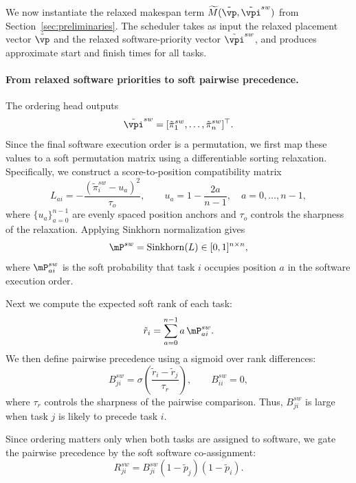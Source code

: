 We now instantiate the relaxed makespan term $\widetilde{M}(\tilde{\vp},\tilde{\vpi}^{sw})$ from Section~\ref{sec:preliminaries}. The scheduler takes as input the relaxed placement vector $\tilde{\vp}$ and the relaxed software-priority vector $\tilde{\vpi}^{sw}$, and produces approximate start and finish times for all tasks.

\paragraph{\textbf{From relaxed software priorities to soft pairwise precedence.}}
The ordering head outputs
\begin{equation}
\tilde{\vpi}^{sw}=[\tilde{\pi}_1^{sw},\ldots,\tilde{\pi}_n^{sw}]^\top.
\end{equation}
Since the final software execution order is a permutation, we first map these values to a soft permutation matrix using a differentiable sorting relaxation. Specifically, we construct a score-to-position compatibility matrix
\begin{equation}
L_{ai}=-\frac{(\tilde{\pi}_i^{sw}-u_a)^2}{\tau_o},
\qquad
u_a=1-\frac{2a}{n-1},
\quad a=0,\ldots,n-1,
\end{equation}
where $\{u_a\}_{a=0}^{n-1}$ are evenly spaced position anchors and $\tau_o$ controls the sharpness of the relaxation. Applying Sinkhorn normalization gives
\begin{equation}
\mP^{sw} = \mathrm{Sinkhorn}(L)\in[0,1]^{n\times n},
\end{equation}
where $\mP^{sw}_{ai}$ is the soft probability that task $i$ occupies position $a$ in the software execution order.

Next we compute the expected soft rank of each task:
\begin{equation}
\tilde{r}_i = \sum_{a=0}^{n-1} a\, \mP^{sw}_{ai}.
\end{equation}
We then define pairwise precedence using a sigmoid over rank differences:
\begin{equation}
B^{sw}_{ji}
=
\sigma\!\left(\frac{\tilde{r}_i-\tilde{r}_j}{\tau_r}\right),
\qquad
B^{sw}_{ii}=0,
\end{equation}
where $\tau_r$ controls the sharpness of the pairwise comparison. Thus, $B^{sw}_{ji}$ is large when task $j$ is likely to precede task $i$.

Since ordering matters only when both tasks are assigned to software, we gate the pairwise precedence by the soft software co-assignment:
\begin{equation}
R^{sw}_{ji}=B^{sw}_{ji}(1-\tilde{p}_j)(1-\tilde{p}_i).
\end{equation}

